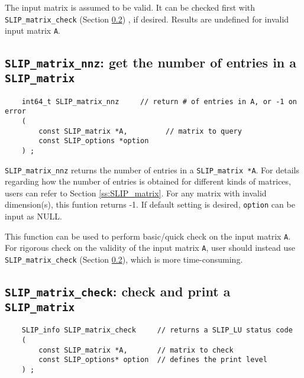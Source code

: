 \documentclass[12pt]{article}
\theoremstyle{definition}
\begin{document}
The input matrix is assumed to be valid. It can be checked first with
\verb|SLIP_matrix_check| (Section \ref{s:user:matrix_check}) , if desired.
Results are undefined for invalid input matrix \verb|A|.


\cprotect\subsection{\verb|SLIP_matrix_nnz|: get the number of entries in a
\verb|SLIP_matrix|}
\label{s:user:matrix_nnz}

\begin{mdframed}[userdefinedwidth=6in]
{\footnotesize
\begin{verbatim}
    int64_t SLIP_matrix_nnz     // return # of entries in A, or -1 on error
    (
        const SLIP_matrix *A,         // matrix to query
        const SLIP_options *option
    ) ;
\end{verbatim}
} \end{mdframed}

\verb|SLIP_matrix_nnz| returns the number of entries in a \verb|SLIP_matrix *A|.
For details regarding how the number of entries is obtained for different kinds
of matrices, users can refer to Section \ref{ss:SLIP_matrix}.
For any matrix with invalid dimension(s), this funtion returns -1.
If default setting is desired, \verb|option| can be input as NULL.

This function can be used to perform basic/quick check on the input matrix
\verb|A|. For rigorous check on the validity of the input matrix \verb|A|, user
should instead use \verb|SLIP_matrix_check| (Section
\ref{s:user:matrix_check}), which is more time-consuming.


\cprotect\subsection{\verb|SLIP_matrix_check|: check and print a \verb|SLIP_matrix|}
\label{s:user:matrix_check}

\begin{mdframed}[userdefinedwidth=6in]
{\footnotesize
\begin{verbatim}
    SLIP_info SLIP_matrix_check     // returns a SLIP_LU status code
    (
        const SLIP_matrix *A,       // matrix to check
        const SLIP_options* option  // defines the print level
    ) ;
\end{verbatim}
} \end{mdframed}
\end{document}

